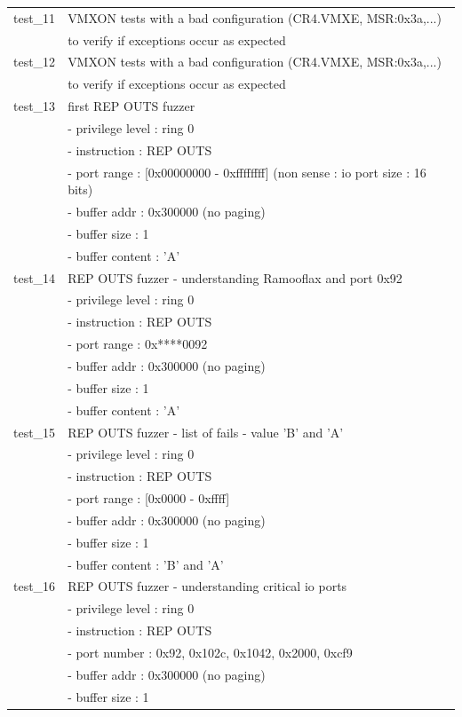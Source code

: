 \documentclass[12pt, openany]{report}
\begin{document}
\begin{longtable}{|l | l |}
test\_11 & VMXON tests with a bad configuration (CR4.VMXE, MSR:0x3a,...)\\
         & to verify if exceptions occur as expected\\
\hline
test\_12 & VMXON tests with a bad configuration (CR4.VMXE, MSR:0x3a,...)\\
         & to verify if exceptions occur as expected\\
\hline
test\_13 & first REP OUTS fuzzer \\
&- privilege level : ring 0 \\
&- instruction     : REP OUTS \\
&- port range      : [0x00000000 - 0xffffffff] (non sense : io port size : 16 bits)\\
&- buffer addr     : 0x300000 (no paging)\\
&- buffer size     : 1\\
&- buffer content  : 'A'\\
\hline
test\_14 &  REP OUTS fuzzer - understanding Ramooflax and port 0x92\\
&- privilege level : ring 0\\
&- instruction     : REP OUTS\\
&- port range      : 0x****0092\\
&- buffer addr     : 0x300000 (no paging)\\
&- buffer size     : 1\\
&- buffer content  : 'A'\\
\hline
test\_15 & REP OUTS fuzzer - list of fails - value 'B' and 'A'\\
&- privilege level : ring 0\\
&- instruction     : REP OUTS\\
&- port range      : [0x0000 - 0xffff]\\
&- buffer addr     : 0x300000 (no paging)\\
&- buffer size     : 1\\
&- buffer content  : 'B' and 'A'\\
\hline
test\_16 & REP OUTS fuzzer - understanding critical io ports\\
&- privilege level : ring 0\\
&- instruction     : REP OUTS\\
&- port number     : 0x92, 0x102c, 0x1042, 0x2000, 0xcf9\\
&- buffer addr     : 0x300000 (no paging)\\
&- buffer size     : 1\\

\end{longtable}
\end{document}
